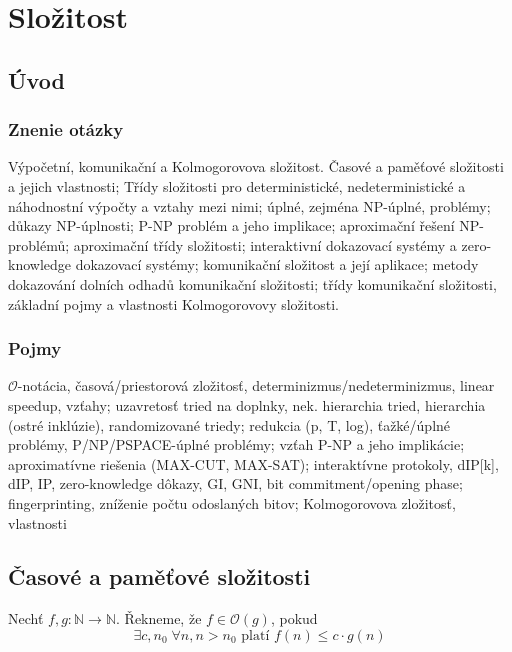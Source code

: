 \section{Složitost}

\subsection{Úvod}

\subsubsection*{Znenie otázky}
Výpočetní, komunikační a Kolmogorovova složitost. Časové a paměťové 
složitosti a jejich vlastnosti; Třídy složitosti pro deterministické, 
nedeterministické a náhodnostní výpočty a vztahy mezi nimi; 
úplné, zejména NP-úplné, problémy; důkazy NP-úplnosti; 
P-NP problém a jeho implikace; aproximační řešení NP-problémů; 
aproximační třídy složitosti; interaktivní dokazovací systémy a 
zero-knowledge dokazovací systémy; komunikační složitost a její aplikace; 
metody dokazování dolních odhadů komunikační složitosti; 
třídy komunikační složitosti, základní pojmy a vlastnosti Kolmogorovovy složitosti. 

\subsubsection*{Pojmy}
$\mathcal{O}$-notácia, časová/priestorová zložitosť, determinizmus/nedeterminizmus,
linear speedup, vzťahy; uzavretosť tried na doplnky, nek. hierarchia tried, 
hierarchia (ostré inklúzie), randomizované triedy; redukcia (p, T, log), 
ťažké/úplné problémy, P/NP/PSPACE-úplné problémy; vzťah P-NP a jeho
implikácie; aproximatívne riešenia (MAX-CUT, MAX-SAT); interaktívne protokoly,
dIP[k], dIP, IP, zero-knowledge dôkazy, GI, GNI, bit commitment/opening phase;
fingerprinting, zníženie počtu odoslaných bitov; Kolmogorovova zložitosť, vlastnosti

\subsection{Časové a paměťové složitosti}

\begin{definition}
    Nechť $f, g : \mathbb{N} \to \mathbb{N}$. Řekneme, že
    $f \in \mathcal{O}(g)$, pokud
    \[
        \exists c, n_0 \; \forall n, n > n_0
        \text{ platí }
        f(n) \leq c \cdot g(n)
    \]
\end{definition}

